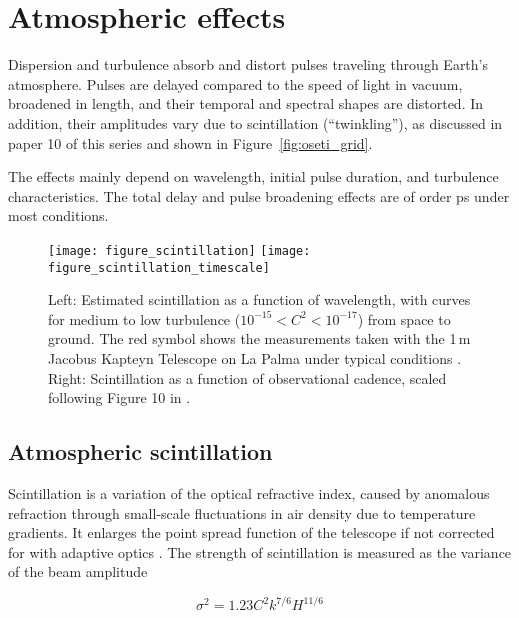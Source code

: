 \documentclass[twocolumn,tighten,longauthor]{myaastex62}
\begin{document}
\section{Atmospheric effects}
\label{sec:atmo}
Dispersion and turbulence absorb and distort pulses traveling through Earth's atmosphere. Pulses are delayed compared to the speed of light in vacuum, broadened in length, and their temporal and spectral shapes are distorted. In addition, their amplitudes vary due to scintillation (``twinkling''), as discussed in paper 10 of this series and shown in Figure~\ref{fig:oseti_grid}.

The effects mainly depend on wavelength, initial pulse duration, and turbulence characteristics. The total delay and pulse broadening effects are of order ps under most conditions.


\begin{figure*}
\texttt{[image: figure\_scintillation]}
\texttt{[image: figure\_scintillation\_timescale]}
\caption{\label{fig:scinti}Left: Estimated scintillation as a function of wavelength, with curves for medium to low turbulence ($10^{-15}<C^2<10^{-17}$) from space to ground. The red symbol shows the measurements taken with the 1\,m Jacobus Kapteyn Telescope on La Palma under typical conditions \citep{2015MNRAS.452.1707O}. Right: Scintillation as a function of observational cadence, scaled following Figure 10 in \citet{2015MNRAS.452.1707O}.}
\end{figure*}


\subsection{Atmospheric scintillation}
\label{sub:atmo_scinti}
Scintillation is a variation of the optical refractive index, caused by anomalous refraction through small-scale fluctuations in air density due to temperature gradients. It enlarges the point spread function of the telescope \citep{1995ApOpt..34.5461C} if not corrected for with adaptive optics \citep{1998aoat.book.....H}. The strength of scintillation is measured as the variance of the beam amplitude \citep[the Rytov variance,][]{1988ApOpt..27.2150A}

\begin{equation}
\sigma^2 = 1.23C^2 k^{7/6} H^{11/6}
\end{equation}
\end{document}
